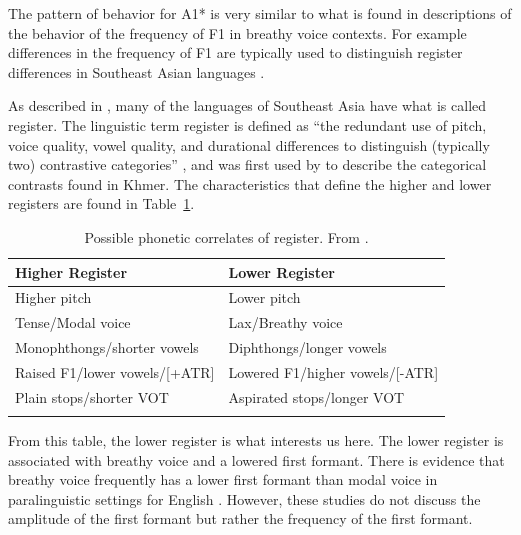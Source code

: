 The pattern of behavior for A1* is very similar to what is found in descriptions of the behavior of the frequency of F1 in breathy voice contexts. For example differences in the frequency of F1 are typically used to distinguish register differences in Southeast Asian languages \citep{brunelleRegisterEasternCham2005,brunelleDialectExperiencePerceptual2012,brunelleTonePhonationSoutheast2016}.

As described in \citet{brunelleTonePhonationSoutheast2016}, many of the languages of Southeast Asia have what is called register. The linguistic term register is defined as ``the redundant use of pitch, voice quality, vowel quality, and durational differences to distinguish (typically two) contrastive categories'' \citep[193]{brunelleTonePhonationSoutheast2016}, and was first used by \citet{hendersonMainFeaturesCambodian1952} to describe the categorical contrasts found in Khmer. The characteristics that define the higher and lower registers are found in Table~\ref{tab:register_correlates}.

\begin{table}[!ht]
    \centering
    \caption{Possible phonetic correlates of register. From \citet{brunelleTonePhonationSoutheast2016}.}
    \label{tab:register_correlates}
    \begin{tabular}{ll}
        \lsptoprule
        \textbf{Higher Register} & \textbf{Lower Register} \\
        \hline
        Higher pitch & Lower pitch \\
        Tense/Modal voice & Lax/Breathy voice \\
        Monophthongs/shorter vowels & Diphthongs/longer vowels \\
        Raised F1/lower vowels/[+ATR] & Lowered F1/higher vowels/[-ATR] \\
        Plain stops/shorter VOT & Aspirated stops/longer VOT \\
        \lspbottomrule
    \end{tabular}
\end{table}

From this table, the lower register is what interests us here. The lower register is associated with breathy voice and a lowered first formant. There is evidence that breathy voice frequently has a lower first formant than modal voice in paralinguistic settings for English \citep{lottoEffectVoiceQuality1997}.  However, these studies do not discuss the amplitude of the first formant but rather the frequency of the first formant.

